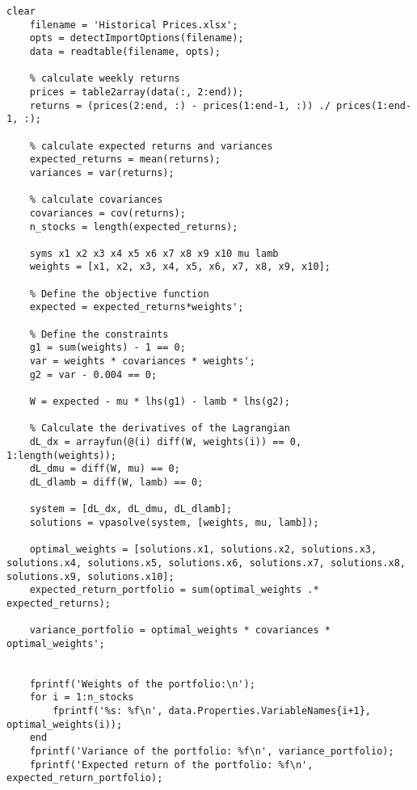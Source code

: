 \documentclass[12pt]{article}
\begin{document}
\begin{lstlisting}[label=lst:d,
    caption=Question d)]
    clear
    filename = 'Historical Prices.xlsx';
    opts = detectImportOptions(filename);
    data = readtable(filename, opts);
    
    % calculate weekly returns
    prices = table2array(data(:, 2:end));
    returns = (prices(2:end, :) - prices(1:end-1, :)) ./ prices(1:end-1, :);
    
    % calculate expected returns and variances
    expected_returns = mean(returns);
    variances = var(returns);
    
    % calculate covariances
    covariances = cov(returns);
    n_stocks = length(expected_returns);
    
    syms x1 x2 x3 x4 x5 x6 x7 x8 x9 x10 mu lamb
    weights = [x1, x2, x3, x4, x5, x6, x7, x8, x9, x10];
    
    % Define the objective function
    expected = expected_returns*weights';
    
    % Define the constraints
    g1 = sum(weights) - 1 == 0; 
    var = weights * covariances * weights'; 
    g2 = var - 0.004 == 0; 
    
    W = expected - mu * lhs(g1) - lamb * lhs(g2);
    
    % Calculate the derivatives of the Lagrangian
    dL_dx = arrayfun(@(i) diff(W, weights(i)) == 0, 1:length(weights));
    dL_dmu = diff(W, mu) == 0;
    dL_dlamb = diff(W, lamb) == 0;
    
    system = [dL_dx, dL_dmu, dL_dlamb];
    solutions = vpasolve(system, [weights, mu, lamb]);
    
    optimal_weights = [solutions.x1, solutions.x2, solutions.x3, solutions.x4, solutions.x5, solutions.x6, solutions.x7, solutions.x8, solutions.x9, solutions.x10];
    expected_return_portfolio = sum(optimal_weights .* expected_returns);
    
    variance_portfolio = optimal_weights * covariances * optimal_weights';
    
    
    fprintf('Weights of the portfolio:\n');
    for i = 1:n_stocks
        fprintf('%s: %f\n', data.Properties.VariableNames{i+1}, optimal_weights(i));
    end
    fprintf('Variance of the portfolio: %f\n', variance_portfolio);
    fprintf('Expected return of the portfolio: %f\n', expected_return_portfolio);
\end{lstlisting}
\end{document}
